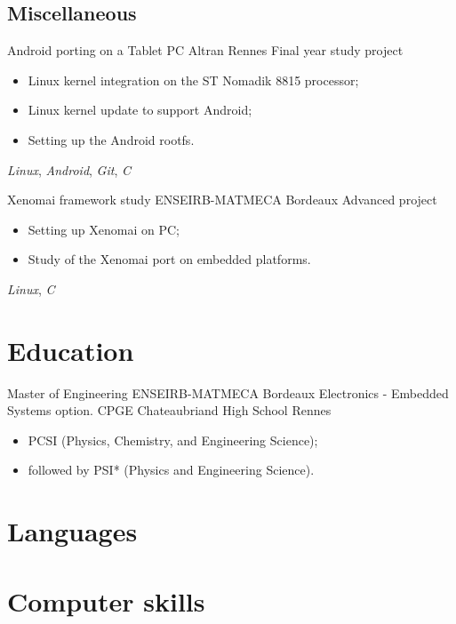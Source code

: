 \documentclass[11pt,a4paper,sans]{moderncv}
\begin{document}
\subsection{Miscellaneous}
	{Android porting on a Tablet PC}
	{Altran}
	{Rennes}
	{Final year study project}
	{
		\begin{itemize}
		\item Linux kernel integration on the ST Nomadik 8815 processor;
		\item Linux kernel update to support Android;
		\item Setting up the Android rootfs.
		\end{itemize}
		\textit{Linux}, \textit{Android},
		\textit{Git},
		\textit{C}
	}
	{Xenomai framework study}
	{ENSEIRB-MATMECA}
	{Bordeaux}
	{Advanced project}
	{
		\begin{itemize}
		\item Setting up Xenomai on PC;
		\item Study of the Xenomai port on embedded platforms.
		\end{itemize}
		\textit{Linux}, \textit{C}
	}

\section{Education}
	{Master of Engineering}
	{ENSEIRB-MATMECA}
	{Bordeaux}
	{}
	{Electronics - Embedded Systems option.}
	{CPGE}
	{Chateaubriand High School}
	{Rennes}
	{}
	{
		\begin{itemize}
		\item PCSI (Physics, Chemistry, and Engineering Science);
		\item followed by PSI* (Physics and Engineering Science).
		\end{itemize}
	}

\section{Languages}

\section{Computer skills}
\end{document}
